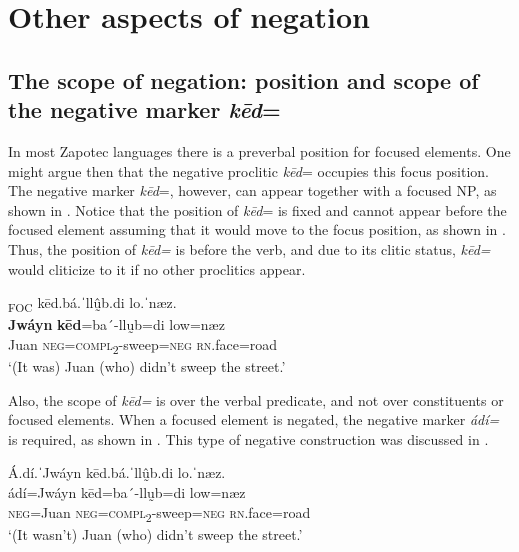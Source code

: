 \documentclass[output=paper,colorlinks=true, citecolor=brown]{langscibook}
\begin{document}
\section{Other aspects of negation} \label{sec:zap:4}
\subsection{The scope of negation: position and scope of the negative marker \textit{kēd}=}\label{sec:zap:4.1}

In most Zapotec languages there is a preverbal position for focused elements. One might argue then that the negative proclitic \textit{kēd}= occupies this focus position. The negative marker \textit{kēd}=, however, can appear together with a focused NP, as shown in . Notice that the position of \textit{kēd}= is fixed and cannot appear before the focused element assuming that it would move to the focus position, as shown in . Thus, the position of \textit{kēd=} is before the verb, and due to its clitic status, \textit{kēd=} would cliticize to it if no other proclitics appear.

\ea\label{ex:zap:85} 
    \glll [ˈJwáyn]\textsubscript{FOC} kēd.bá.ˈllṵ̂b.di lo.ˈnæz.\\ 
          \textbf{Jwáyn} \textbf{kēd}=ba´-llṵb=di low=næz\\
          Juan \textsc{neg}=\textsc{compl}\textsc{\textsubscript{2}}{}-sweep=\textsc{neg} \textsc{rn}.face=road\\
    \glt ‘(It was) Juan (who) didn’t sweep the street.’
\z 

\z 
Also, the scope of \textit{kēd=} is over the verbal predicate, and not over constituents or focused elements. When a focused element is negated, the negative marker \textit{ádí=} is required, as shown in . This type of negative construction was discussed in .

\ea\label{ex:zap:87} 
    \glll Á.dí.ˈJwáyn kēd.bá.ˈllṵ̂b.di lo.ˈnæz.\\ 
          ádí=Jwáyn kēd=ba´-llṵb=di low=næz\\
          \textsc{neg}=Juan \textsc{neg}=\textsc{compl}\textsc{\textsubscript{2}}{}-sweep=\textsc{neg} \textsc{rn}.face=road\\
    \glt ‘(It wasn’t) Juan (who) didn’t sweep the street.’
\z 
\end{document}
